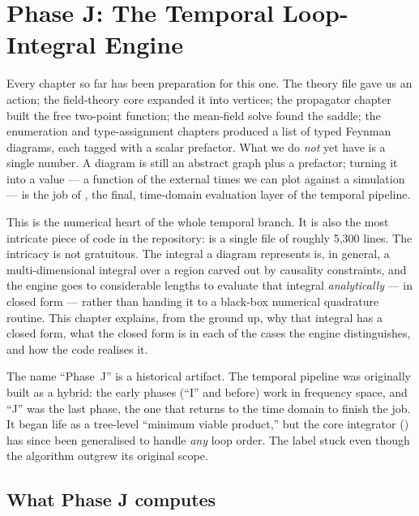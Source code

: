 \chapter{Phase J: The Temporal Loop-Integral Engine}\label{ch:phasej-temporal}

Every chapter so far has been preparation for this one. The theory file gave us
an action; the field-theory core expanded it into vertices; the propagator
chapter built the free two-point function; the mean-field solve found the
saddle; the enumeration and type-assignment chapters produced a list of typed
Feynman diagrams, each tagged with a scalar prefactor. What we do \emph{not} yet
have is a single number. A diagram is still an abstract graph plus a
prefactor; turning it into a value --- a function of the external times we can
plot against a simulation --- is the job of , the final,
time-domain evaluation layer of the temporal pipeline.

This is the numerical heart of the whole temporal branch. It is also the most
intricate piece of code in the repository:  is a single
file of roughly 5{,}300 lines. The intricacy is not gratuitous. The integral a
diagram represents is, in general, a multi-dimensional integral over a region
carved out by causality constraints, and the engine goes to considerable
lengths to evaluate that integral \emph{analytically} --- in closed form ---
rather than handing it to a black-box numerical quadrature routine. This chapter
explains, from the ground up, why that integral has a closed form, what the
closed form is in each of the cases the engine distinguishes, and how the code
realises it.

\begin{note}
The name ``Phase~J'' is a historical artifact. The temporal pipeline was
originally built as a hybrid: the early phases (``I'' and before) work in
frequency space, and ``J'' was the last phase, the one that returns to the time
domain to finish the job. It began life as a tree-level ``minimum viable
product,'' but the core integrator () has since been
generalised to handle \emph{any} loop order. The label stuck even though the
algorithm outgrew its original scope.
\end{note}

\section{What Phase J computes}

